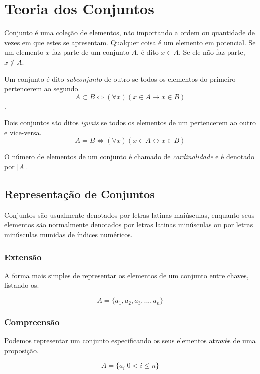 \chapter{Teoria dos Conjuntos}

Conjunto é uma coleção de elementos, não importando a ordem ou quantidade de vezes em que estes se apresentam. Qualquer coisa é um elemento em potencial. Se um elemento $x$ faz parte de um conjunto $A$, é dito $x \in A$. Se ele não faz parte, $x \not \in A$.

\begin{df}
Um conjunto é dito \emph{subconjunto} de outro se todos os elementos do primeiro pertencerem ao segundo. \[A \subset B \Leftrightarrow (\forall x) (x\in A \rightarrow x \in B)\].
\end{df}
\vspace{-24pt}
\begin{df}
Dois conjuntos são ditos \emph{iguais} se todos os elementos de um pertencerem ao outro e vice-versa.\[A=B \Leftrightarrow (\forall x)(x \in A \leftrightarrow x \in B)\]
\end{df}
\begin{df}
O número de elementos de um conjunto é chamado de \emph{cardinalidade} e é denotado por $|A|$.
\end{df}
\section{Representação de Conjuntos\cite{ticj}}
Conjuntos são usualmente denotados por letras latinas maiúsculas, enquanto seus elementos são normalmente denotados por letras latinas minúsculas ou por letras minúsculas munidas de índices numéricos. 

\subsection*{Extensão}
A forma mais simples de representar os elementos de um conjunto entre chaves, listando-os.
\begin{exemplo}
\[A=\{a_1,a_2,a_3,..., a_n\}\]
\end{exemplo}

\subsection*{Compreensão}
Podemos representar um conjunto especificando os seus elementos através de uma proposição. \begin{exemplo}
\[A=\{a_i | 0<i \le n\}\]
\end{exemplo}

